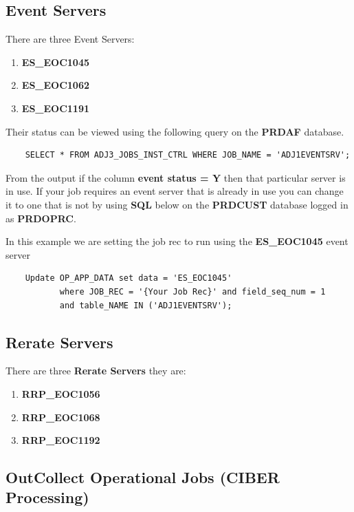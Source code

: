 \documentclass[12pt,twoside]{article}
\begin{document}
\normalsize
\subsection{Event Servers}
\label{sec-3-5}

   There are three Event Servers: 
\begin{enumerate}
\item \textbf{ES\_EOC1045}
\item \textbf{ES\_EOC1062}
\item \textbf{ES\_EOC1191}
\end{enumerate}

   Their status can be viewed using the following query on the \textbf{PRDAF} database. 
\begin{verbatim}
    SELECT * FROM ADJ3_JOBS_INST_CTRL WHERE JOB_NAME = 'ADJ1EVENTSRV';
\end{verbatim}
   From the output if the column \textbf{event status = Y} then that particular server is in use. 
   If your job requires an event server that is already in use you can change it to one that is not by using \textbf{SQL} below on the \textbf{PRDCUST} database logged in as \textbf{PRDOPRC}. 

   In this example we are setting the job rec to run using the \textbf{ES\_EOC1045} event server 

\begin{verbatim}
    Update OP_APP_DATA set data = 'ES_EOC1045'
           where JOB_REC = '{Your Job Rec}' and field_seq_num = 1 
           and table_NAME IN ('ADJ1EVENTSRV');
\end{verbatim}
\subsection{Rerate Servers}
\label{sec-3-6}

   There are three \textbf{Rerate Servers} they are:
\begin{enumerate}
\item \textbf{RRP\_EOC1056}
\item \textbf{RRP\_EOC1068}
\item \textbf{RRP\_EOC1192}
\end{enumerate}
\subsection{OutCollect Operational Jobs (CIBER Processing)}
\label{sec-3-7}
\end{document}
